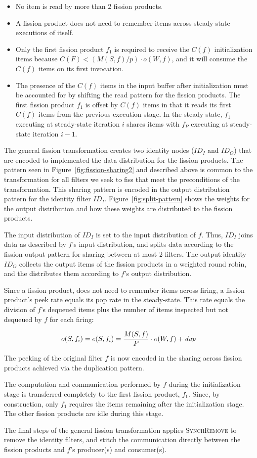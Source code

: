 \begin{itemize}
\item No item is read by more than 2 fission products.
\item  A fission product does not need to remember items across
  steady-state executions of itself.
\item Only the first fission product $f_1$ is required to receive the $C(f)$
  initialization  items because $C(F) < (M(S,f) / p) \cdot o(W, f)$,
  and it will consume the $C(f)$ items on its first invocation.
\item The presence of the $C(f)$ items in the input buffer after
  initialization must be accounted for by shifting the read pattern
  for the fission products.  The first fission product $f_1$ is offset by
  $C(f)$ items in that it reads its first $C(f)$ items from the
  previous execution stage.  In the steady-state, $f_1$ executing at
  steady-state iteration $i$ shares items with $f_P$ executing at
  steady-state iteration $i-1$.
\end{itemize}

The general fission transformation creates two identity nodes ($ID_I$
and $ID_O$) that are encoded to implemented the data distribution for
the fission products.  The pattern seen in
Figure~\ref{fig:fission-sharing2} and described above is common to the
transformation for all filters we seek to fiss that meet the
preconditions of the transformation.  This sharing pattern is encoded
in the output distribution pattern for the identity filter $ID_I$.
Figure~\ref{fig:split-pattern} shows the weights for the output
distribution and how these weights are distributed to the fission
products.

The input distribution of $ID_I$ is set to the input distribution of
$f$.  Thus, $ID_I$ joins data as described by $f$'s input
distribution, and splits data according to the fission output pattern
for sharing between at most 2 filters.  The output identity $ID_O$
collects the output items of the fission products in a weighted round
robin, and the distributes them according to $f$'s output distribution.

Since a fission product, does not need to remember items across
firing, a fission product's peek rate equals its pop rate in the
steady-state.  This rate equals the division of $f$'s dequeued
items plus the number of items inspected but not dequeued by $f$ for
each firing:   

\[ o(S,f_i) = e(S, f_i) = \frac{M(S, f)}{P} \cdot o(W, f) + \mbox{\it dup} \]

\noindent The peeking of the original filter $f$ is now encoded in
the sharing across fission products achieved via the duplication
pattern.

The computation and communication performed by $f$ during the
initialization stage is transferred completely to the first fission
product, $f_1$.  Since, by construction, only $f_1$ requires the items
remaining after the initialization stage.  The other fission products
are idle during this stage.

The final steps of the general fission transformation applies
\textsc{SynchRemove} to remove the identity filters, and stitch the
communication directly between the fission products and $f$'s
producer(s) and consumer(s).
